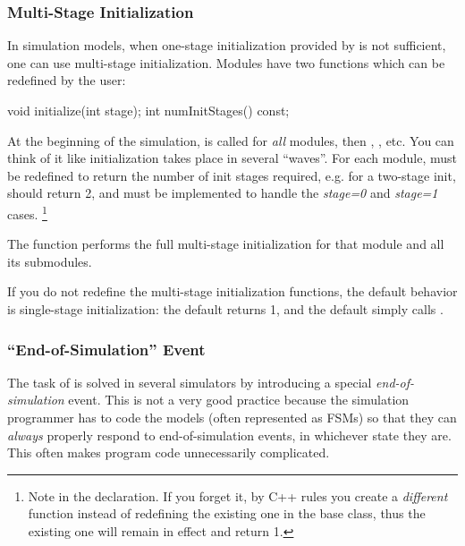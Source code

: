 \subsubsection{Multi-Stage Initialization}
\label{sec:simple-modules:multi-stage-init}


In simulation models, when one-stage
initialization provided by 
is not sufficient, one can use multi-stage
initialization.  Modules have two
functions which can be redefined by the user:

\begin{cpp}
void initialize(int stage);
int numInitStages() const;
\end{cpp}

At the beginning of the simulation, 
is called for \textit{all} modules, then ,
, etc. You can think of it like
initialization takes place in several ``waves''. For each module,
 must be redefined to return the number of init
stages required, e.g. for a two-stage init, 
should return 2, and  must be implemented to
handle the \textit{stage=0} and \textit{stage=1} cases.
  \footnote{Note  in the  declaration.
  If you forget it, by C++ rules you create a \textit{different} function
  instead of redefining the existing one in the base class, thus the
  existing one will remain in effect and return 1.}

The  function performs the full multi-stage initialization
for that module and all its submodules.

If you do not redefine the multi-stage initialization functions, the
default behavior is single-stage initialization: the default
 returns 1, and the default 
simply calls .


\subsubsection{``End-of-Simulation'' Event}

The task of  is solved in several simulators
by introducing a special \textit{end-of-simulation} event.
This is not a very good practice because the simulation programmer has to
code the models (often represented as FSMs) so that they can \textit{always}
properly respond to end-of-simulation events, in whichever state they are. This
often makes program code unnecessarily complicated.

